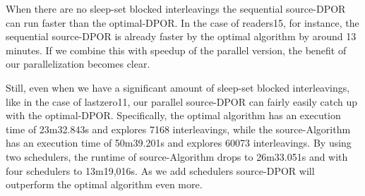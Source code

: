 When there are no sleep-set blocked interleavings the sequential source-DPOR
can run faster than the optimal-DPOR. 
In the case of readers15, for instance, the sequential source-DPOR is already faster by the optimal algorithm by
around 13 minutes. If we combine this with speedup of the parallel version, the benefit of our parallelization becomes clear.

Still, even when we have a significant amount of sleep-set blocked interleavings, like in the case of lastzero11, our parallel
source-DPOR can fairly easily catch up with the optimal-DPOR. Specifically, the optimal algorithm has an execution time of 23m32.843s
and explores 7168 interleavings, while the source-Algorithm has an execution time of 50m39.201s and explores 60073 interleavings.
By using two schedulers, the runtime of source-Algorithm drops to 26m33.051s and with four schedulers to 13m19,016s. As we add
schedulers source-DPOR will outperform the optimal algorithm even more.

